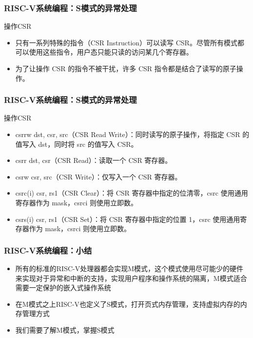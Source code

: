 
\begin{frame}
    \frametitle{RISC-V系统编程：S模式的异常处理}
    
    操作CSR
    \begin{itemize}
        \item 只有一系列特殊的指令（CSR Instruction）可以读写 CSR。尽管所有模式都可以使用这些指令，用户态只能只读的访问某几个寄存器。
        \item 为了让操作 CSR 的指令不被干扰，许多 CSR 指令都是结合了读写的原子操作。

        
    \end{itemize}
\end{frame}


\begin{frame}
    \frametitle{RISC-V系统编程：S模式的异常处理}
    
    操作CSR
    \begin{itemize}
        \item csrrw dst, csr, src（CSR Read Write）：同时读写的原子操作，将指定 CSR 的值写入 dst，同时将 src 的值写入 CSR。
        \item csrr dst, csr（CSR Read）：读取一个 CSR 寄存器。
        \item csrw csr, src（CSR Write）：仅写入一个 CSR 寄存器。
        \item csrc(i) csr, rs1（CSR Clear）：将 CSR 寄存器中指定的位清零，csrc 使用通用寄存器作为 mask，csrci 则使用立即数。
        \item csrs(i) csr, rs1（CSR Set）：将 CSR 寄存器中指定的位置 1，csrc 使用通用寄存器作为 mask，csrci 则使用立即数。
    \end{itemize}
\end{frame}


\begin{frame}
    \frametitle{RISC-V系统编程：小结}
    
    \begin{itemize}
        \item 所有的标准的RISC-V处理器都会实现M模式，这个模式使用尽可能少的硬件来实现对于异常和中断的支持，实现用户程序和操作系统的隔离，M模式适合需要一定保护的嵌入式操作系统
        \item 在M模式之上RISC-V也定义了S模式，打开页式内存管理，支持虚拟内存的内存管理方式
        \item 我们需要了解M模式，掌握S模式
    \end{itemize}
\end{frame}

